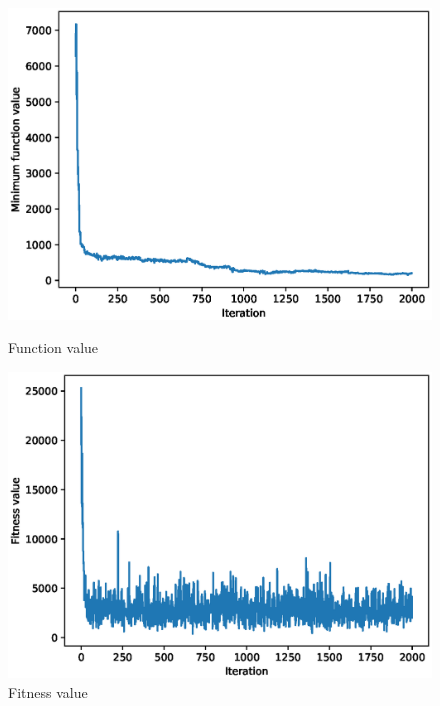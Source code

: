 \documentclass{article}
\begin{document}
\begin{figure}[!htbp]
	\centering
	\begin{minipage}{.48\textwidth}
		\centering
		\includegraphics[scale=.4]{experiment_1b_rosenbrock/min_eval_0.eps}
		\caption{Function value}
	\end{minipage}\hfill
	\begin{minipage}{.48\textwidth}
		\centering
		\includegraphics[scale=.4]{experiment_1b_rosenbrock/max_fitness_0.eps}
		\caption{Fitness value}
	\end{minipage}
\end{figure}
\FloatBarrier
\end{document}
